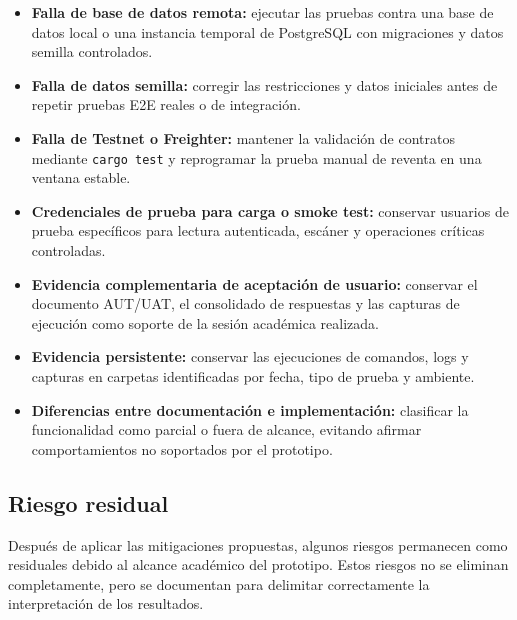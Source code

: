 \documentclass[12pt,letterpaper]{article}
\begin{document}
\begin{itemize}
    \item \textbf{Falla de base de datos remota:} ejecutar las pruebas contra una base de datos local o una instancia temporal de PostgreSQL con migraciones y datos semilla controlados.

    \item \textbf{Falla de datos semilla:} corregir las restricciones y datos iniciales antes de repetir pruebas E2E reales o de integración.

    \item \textbf{Falla de Testnet o Freighter:} mantener la validación de contratos mediante \texttt{cargo test} y reprogramar la prueba manual de reventa en una ventana estable.

    \item \textbf{Credenciales de prueba para carga o smoke test:} conservar usuarios de prueba específicos para lectura autenticada, escáner y operaciones críticas controladas.

    \item \textbf{Evidencia complementaria de aceptación de usuario:} conservar el documento AUT/UAT, el consolidado de respuestas y las capturas de ejecución como soporte de la sesión académica realizada.

    \item \textbf{Evidencia persistente:} conservar las ejecuciones de comandos, logs y capturas en carpetas identificadas por fecha, tipo de prueba y ambiente.

    \item \textbf{Diferencias entre documentación e implementación:} clasificar la funcionalidad como parcial o fuera de alcance, evitando afirmar comportamientos no soportados por el prototipo.
\end{itemize}

\subsection{Riesgo residual}

Después de aplicar las mitigaciones propuestas, algunos riesgos permanecen como residuales debido al alcance académico del prototipo. Estos riesgos no se eliminan completamente, pero se documentan para delimitar correctamente la interpretación de los resultados.
\end{document}
